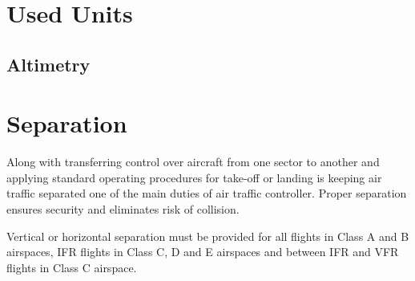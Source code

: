 \section{Used Units}
\subsection{Altimetry}








\section{Separation}

Along with transferring control over aircraft from one sector to another and applying standard operating procedures for take-off or landing is keeping air traffic separated one of the main duties of air traffic controller. Proper separation ensures security and eliminates risk of collision. \cite[Chapter 2]{order7110}

Vertical or horizontal separation must be provided for all flights in Class A and B airspaces, IFR flights in Class C, D and E airspaces and between IFR and VFR flights in Class C airspace. \cite[Chapter 5]{doc4444}

